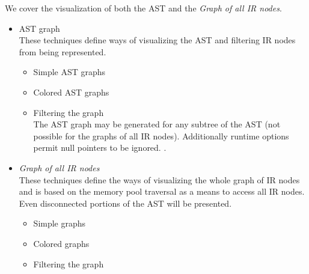 We cover the visualization of both the AST and the {\em Graph of all IR nodes}.
\begin{itemize}
   \item AST graph \\
   These techniques define ways of visualizing the AST and filtering IR nodes from being represented.
   \begin{itemize}
      \item Simple AST graphs
      \item Colored AST graphs
      \item Filtering the graph \\
      The AST graph may be generated for any subtree of the AST (not possible for the
    graphs of all IR nodes).  Additionally runtime options permit null pointers to be
    ignored. .
   \end{itemize}
   \item {\em Graph of all IR nodes} \\
   These techniques define the ways of visualizing the whole graph of IR nodes and is
    based on the memory pool traversal as a means to access all IR nodes.  Even
    disconnected portions of the AST will be presented.
   \begin{itemize}
      \item Simple graphs
      \item Colored graphs
      \item Filtering the graph
   \end{itemize}
\end{itemize}

